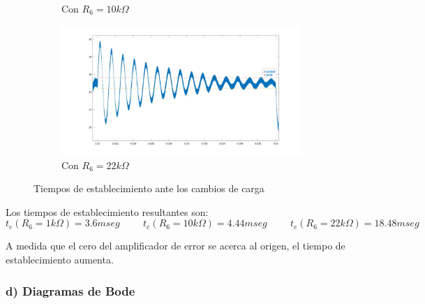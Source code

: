 \documentclass[e4_tp2_main.tex]{subfiles}
\begin{document}
\begin{figure}[H]
\begin{subfigure}[b]{0.3\textwidth}
    \caption{ Con $R_6=10k\Omega$}
    \label{fig:f2}
  \end{subfigure}
  \hfill
  \begin{subfigure}[b]{0.3\textwidth}
    \includegraphics[width=\textwidth, height=\textwidth]{Imagenes/Punto1/Test_con_R6_22k.jpeg}
    \caption{ Con $R_6=22k\Omega$}
    \label{fig:f3}
  \end{subfigure}
  \caption{Tiempos de establecimiento ante los cambios de carga}
\end{figure}

Los tiempos de establecimiento resultantes son: 
\hspace{0.1cm}
\begin{equation}
t_e(R_6=1k\Omega)=3.6 mseg
\hspace{1cm}
t_e(R_6=10k\Omega)=4.44 mseg
\hspace{1cm}
t_e(R_6=22k\Omega)=18.48 mseg
\end{equation}

A medida que el cero del amplificador de error se acerca al origen, el tiempo de establecimiento aumenta.  


\subsubsection*{d) Diagramas de Bode}
\end{document}
